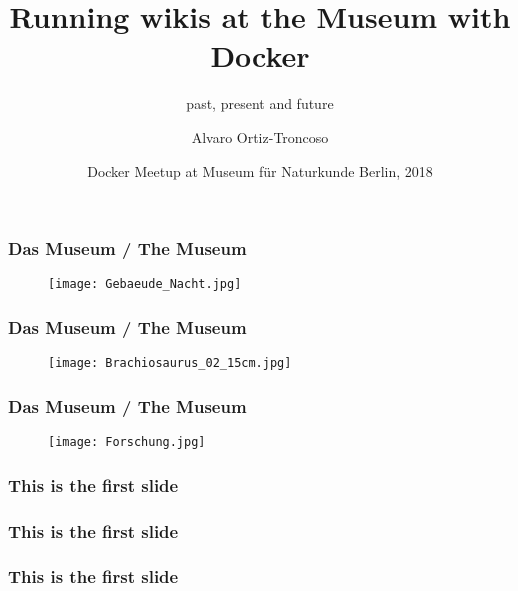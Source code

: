 \documentclass{beamer}
\title
{Running wikis at the Museum with Docker}
\subtitle{past, present and future}
\author
{Alvaro Ortiz-Troncoso\inst{1}}
\institute %
{
  \inst{1}%
  Museum für Naturkunde Berlin
}
\date
{Docker Meetup at Museum für Naturkunde Berlin, 2018}
\begin{document}
{
  \frame{\titlepage}
}

\begin{frame}
  \frametitle{Das Museum / The Museum}
  \begin{figure}
  \texttt{[image: Gebaeude\_Nacht.jpg]}
  \end{figure}
\end{frame}

\begin{frame}
  \frametitle{Das Museum / The Museum}
  \begin{figure}
  \texttt{[image: Brachiosaurus\_02\_15cm.jpg]}
  \end{figure}
\end{frame}

\begin{frame}
  \frametitle{Das Museum / The Museum}
  \begin{figure}
  \texttt{[image: Forschung.jpg]}
  \end{figure}
\end{frame}

\begin{frame}
  \frametitle{This is the first slide}
\end{frame}

\begin{frame}
  \frametitle{This is the first slide}
\end{frame}

\begin{frame}
  \frametitle{This is the first slide}
\end{frame}
\end{document}
